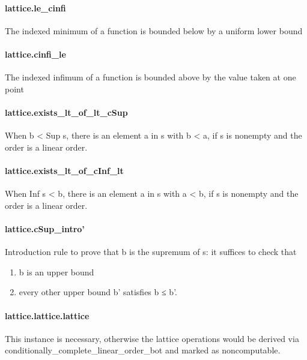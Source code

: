\documentclass{article}
\begin{document}
\paragraph{lattice.le\_cinfi}
\par
The indexed minimum of a function is bounded below by a uniform lower bound
\paragraph{lattice.cinfi\_le}
\par
The indexed infimum of a function is bounded above by the value taken at one point
\paragraph{lattice.exists\_lt\_of\_lt\_cSup}
\par
When b 
<
 Sup s, there is an element a in s with b 
<
 a, if s is nonempty and the order is
a linear order.
\paragraph{lattice.exists\_lt\_of\_cInf\_lt}
\par
When Inf s 
<
 b, there is an element a in s with a 
<
 b, if s is nonempty and the order is
a linear order.
\paragraph{lattice.cSup\_intro'}
\par
Introduction rule to prove that b is the supremum of s: it suffices to check that
\begin{enumerate}[1]
\item b is an upper bound

\item every other upper bound b' satisfies b ≤ b'.

\end{enumerate}\paragraph{lattice.lattice.lattice}
\par
This instance is necessary, otherwise the lattice operations would be derived via
conditionally\_complete\_linear\_order\_bot and marked as noncomputable.
\end{document}
